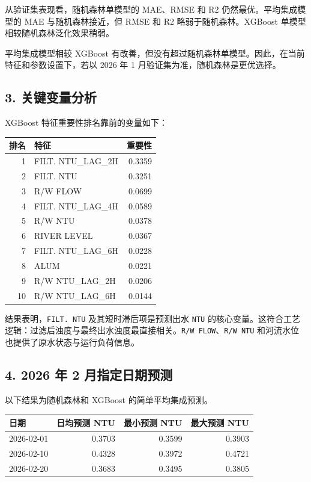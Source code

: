 \documentclass[
]{ctexart}
\begin{document}
从验证集表现看，随机森林单模型的 MAE、RMSE 和 R2
仍然最优。平均集成模型的 MAE 与随机森林接近，但 RMSE 和 R2
略弱于随机森林。XGBoost 单模型相较随机森林泛化效果稍弱。

平均集成模型相较 XGBoost
有改善，但没有超过随机森林单模型。因此，在当前特征和参数设置下，若以
2026 年 1 月验证集为准，随机森林是更优选择。

\hypertarget{ux5173ux952eux53d8ux91cfux5206ux6790}{%
\subsection{3.
关键变量分析}\label{ux5173ux952eux53d8ux91cfux5206ux6790}}

XGBoost 特征重要性排名靠前的变量如下：

\begin{longtable}[]{@{}rlr@{}}
\toprule
排名 & 特征 & 重要性 \\
\midrule
\endhead
1 & FILT. NTU\_LAG\_2H & 0.3359 \\
2 & FILT. NTU & 0.3251 \\
3 & R/W FLOW & 0.0699 \\
4 & FILT. NTU\_LAG\_4H & 0.0589 \\
5 & R/W NTU & 0.0378 \\
6 & RIVER LEVEL & 0.0367 \\
7 & FILT. NTU\_LAG\_6H & 0.0228 \\
8 & ALUM & 0.0221 \\
9 & R/W NTU\_LAG\_2H & 0.0206 \\
10 & R/W NTU\_LAG\_6H & 0.0144 \\
\bottomrule
\end{longtable}

结果表明，\texttt{FILT.\ NTU} 及其短时滞后项是预测出水 \texttt{NTU}
的核心变量。这符合工艺逻辑：过滤后浊度与最终出水浊度最直接相关。\texttt{R/W\ FLOW}、\texttt{R/W\ NTU}
和河流水位也提供了原水状态与运行负荷信息。

\hypertarget{ux5e74-2-ux6708ux6307ux5b9aux65e5ux671fux9884ux6d4b}{%
\subsection{4. 2026 年 2
月指定日期预测}\label{ux5e74-2-ux6708ux6307ux5b9aux65e5ux671fux9884ux6d4b}}

以下结果为随机森林和 XGBoost 的简单平均集成预测。

\begin{longtable}[]{@{}lrrr@{}}
\toprule
日期 & 日均预测 NTU & 最小预测 NTU & 最大预测 NTU \\
\midrule
\endhead
2026-02-01 & 0.3703 & 0.3599 & 0.3903 \\
2026-02-10 & 0.4328 & 0.3972 & 0.4721 \\
2026-02-20 & 0.3683 & 0.3495 & 0.3805 \\
\bottomrule
\end{longtable}
\end{document}
